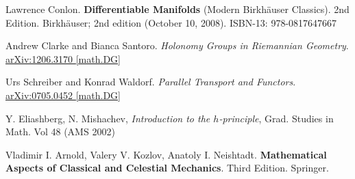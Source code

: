 \documentclass[10pt]{amsart}
\begin{document}
\begin{thebibliography}{9}
Lawrence Conlon.  \textbf{Differentiable Manifolds} (Modern Birkhäuser Classics).  2nd Edition.  Birkhäuser; 2nd edition (October 10, 2008).  ISBN-13: 978-0817647667




Andrew Clarke and Bianca Santoro.  \emph{Holonomy Groups in Riemannian Geometry}.  \href{https://arxiv.org/pdf/1206.3170.pdf}{arXiv:1206.3170 [math.DG]}

Urs Schreiber and Konrad Waldorf.  \emph{Parallel Transport and Functors}.  \href{https://arxiv.org/pdf/0705.0452.pdf}{arXiv:0705.0452 [math.DG]}

Y. Eliashberg, N. Mishachev, \emph{Introduction to the $h$-principle}, Grad. Studies in Math. Vol 48 (AMS 2002)


Vladimir I. Arnold, Valery V. Kozlov, Anatoly I. Neishtadt.  \textbf{Mathematical Aspects of Classical and Celestial Mechanics}.  Third Edition.  Springer.  


\end{thebibliography}
\end{document}
